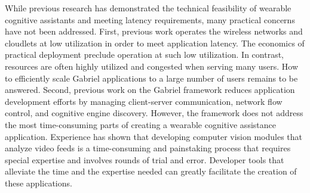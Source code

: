 While previous research has demonstrated the technical feasibility of wearable
cognitive assistants and meeting latency requirements, many practical concerns
have not been addressed. First, previous work operates the wireless networks and
cloudlets at low utilization in order to meet application latency. The economics
of practical deployment preclude operation at such low utilization. In contrast,
resources are often highly utilized and congested when serving many users. How
to efficiently scale Gabriel applications to a large number of users remains to
be answered. Second, previous work on the Gabriel framework reduces application
development efforts by managing client-server communication, network flow
control, and cognitive engine discovery. However, the framework does not address
the most time-consuming parts of creating a wearable cognitive assistance
application. Experience has shown that developing computer vision modules that
analyze video feeds is a time-consuming and painstaking process that requires
special expertise and involves rounds of trial and error. Developer tools that
alleviate the time and the expertise needed can greatly facilitate the creation
of these applications.




